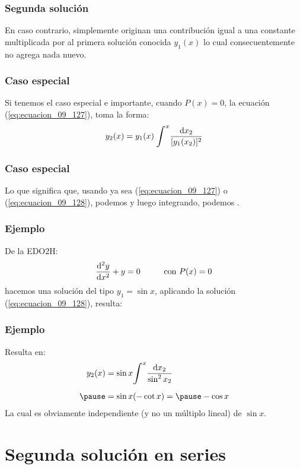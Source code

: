 \documentclass[12pt]{beamer}
\begin{document}
\begin{frame}
\frametitle{Segunda solución}
En caso contrario, simplemente originan una contribución igual a una constante multiplicada por al primera solución conocida $y_{1} (x)$ lo cual consecuentemente no agrega nada nuevo.
\end{frame}
\begin{frame}
\frametitle{Caso especial}
Si tenemos el caso especial e importante, cuando $P (x) = 0$, la ecuación (\ref{eq:ecuacion_09_127}), toma la forma:
\pause
\begin{align}
y_{2} (x) =  y_{1} (x) \: \scaleint{6ex}^{x} \dfrac{\dd{x_{2}}}{[y_{1} (x_{2})]^{2}}
\label{eq:ecuacion_09_128}
\end{align}
\end{frame}
\begin{frame}
\frametitle{Caso especial}
Lo que significa que, usando ya sea (\ref{eq:ecuacion_09_127}) o (\ref{eq:ecuacion_09_128}), podemos  y luego integrando, podemos .
\end{frame}
\begin{frame}
\frametitle{Ejemplo}
De la EDO2H:
\begin{align*}
\dv[2]{y}{x} + y = 0 \hspace{1cm} \mbox{con } P(x) = 0
\end{align*}
\pause
hacemos una solución del tipo $y_{1} = \sin x$, \pause aplicando la solución (\ref{eq:ecuacion_09_128}), resulta:
\end{frame}
\begin{frame}
\frametitle{Ejemplo}
Resulta en:
\pause
\begin{eqnarray*}
\begin{aligned}
y_{2} (x) &= \sin x \scaleint{6ex}^{x} \dfrac{\dd{x_{2}}}{\sin^{2} x_{2}} \\[0.5em] \pause
&= \sin x (-\cot x) = \pause - \cos x
\end{aligned}
\end{eqnarray*}
\pause
La cual es obviamente independiente (y no un múltiplo lineal) de $\sin x$.
\end{frame}

\section{Segunda solución en series}
\end{document}

